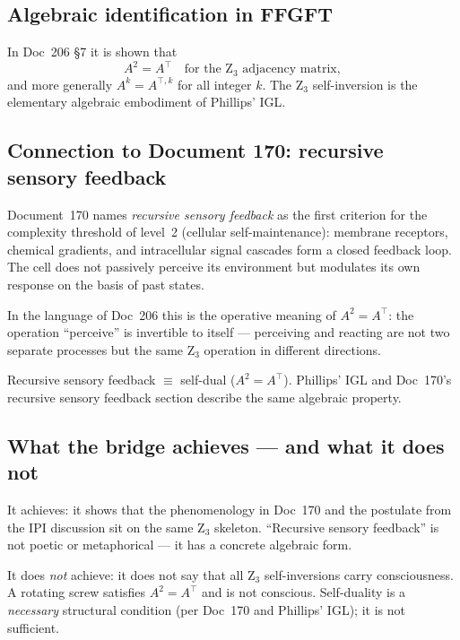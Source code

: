\subsection{Algebraic identification in FFGFT}

In Doc~206 \S7 it is shown that
\begin{equation}
A^2 = A^\top \quad \text{for the Z}_3 \text{ adjacency matrix},
\end{equation}
and more generally $A^k = A^{\top, k}$ for all integer $k$. The Z$_3$ self-inversion is the elementary algebraic embodiment of Phillips' IGL.

\subsection{Connection to Document 170: recursive sensory feedback}

Document~170 names \emph{recursive sensory feedback} as the first criterion for the complexity threshold of level~2 (cellular self-maintenance): membrane receptors, chemical gradients, and intracellular signal cascades form a closed feedback loop. The cell does not passively perceive its environment but modulates its own response on the basis of past states.

In the language of Doc~206 this is the operative meaning of $A^2 = A^\top$: the operation ``perceive'' is invertible to itself --- perceiving and reacting are not two separate processes but the same Z$_3$ operation in different directions.

\begin{insightBox}
Recursive sensory feedback $\equiv$ self-dual ($A^2 = A^\top$). Phillips' IGL and Doc~170's recursive sensory feedback section describe the same algebraic property.
\end{insightBox}

\subsection{What the bridge achieves --- and what it does not}

It achieves: it shows that the phenomenology in Doc~170 and the postulate from the IPI discussion sit on the same Z$_3$ skeleton. ``Recursive sensory feedback'' is not poetic or metaphorical --- it has a concrete algebraic form.

It does \emph{not} achieve: it does not say that all Z$_3$ self-inversions carry consciousness. A rotating screw satisfies $A^2 = A^\top$ and is not conscious. Self-duality is a \emph{necessary} structural condition (per Doc~170 and Phillips' IGL); it is not sufficient.

